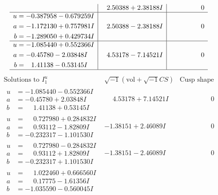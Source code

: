 \documentclass[1p]{elsarticle_modified}
\theoremstyle{definition}
\newcommand{\I}{\sqrt{-1}}
\begin{document}
$$\begin{array}{c|c|c}
 & \phantom{-}2.50388 + 2.38188 I & \phantom{-0.000000 } 0 \\ \hline\begin{aligned}
u &= -0.387958 - 0.679259 I \\
a &= -1.172130 + 0.757981 I \\
b &= -1.289050 + 0.429734 I\end{aligned}
 & \phantom{-}2.50388 - 2.38188 I & \phantom{-0.000000 } 0 \\ \hline\begin{aligned}
u &= -1.085440 + 0.552366 I \\
a &= -0.45780 - 2.03848 I \\
b &= \phantom{-}1.41138 - 0.53145 I\end{aligned}
 & \phantom{-}4.53178 - 7.14521 I & \phantom{-0.000000 } 0\\
 \hline 
 \end{array}$$\newpage$$\begin{array}{c|c|c}  
\text{Solutions to }I^u_{1}& \I (\text{vol} + \sqrt{-1}CS) & \text{Cusp shape}\\
 \hline 
\begin{aligned}
u &= -1.085440 - 0.552366 I \\
a &= -0.45780 + 2.03848 I \\
b &= \phantom{-}1.41138 + 0.53145 I\end{aligned}
 & \phantom{-}4.53178 + 7.14521 I & \phantom{-0.000000 } 0 \\ \hline\begin{aligned}
u &= \phantom{-}0.727980 + 0.284832 I \\
a &= \phantom{-}0.93112 - 1.82809 I \\
b &= -0.232317 - 1.101530 I\end{aligned}
 & -1.38151 + 2.46089 I & \phantom{-0.000000 } 0 \\ \hline\begin{aligned}
u &= \phantom{-}0.727980 - 0.284832 I \\
a &= \phantom{-}0.93112 + 1.82809 I \\
b &= -0.232317 + 1.101530 I\end{aligned}
 & -1.38151 - 2.46089 I & \phantom{-0.000000 } 0 \\ \hline\begin{aligned}
u &= \phantom{-}1.022460 + 0.666560 I \\
a &= \phantom{-}0.17775 - 1.61356 I \\
b &= -1.035590 - 0.560045 I\end{aligned}

\end{array}$$
\end{document}
